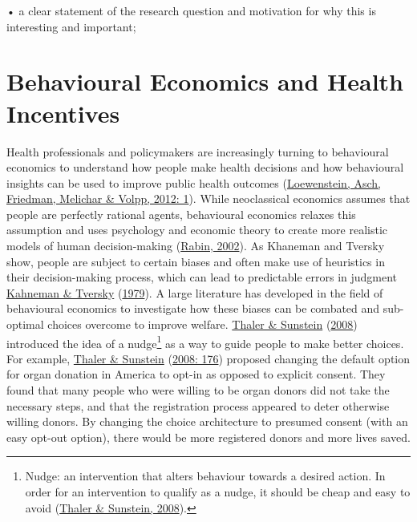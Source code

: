 \documentclass[11pt,preprint, authoryear]{elsarticle}
\numberwithin{equation}{section}
\numberwithin{figure}{section}
\numberwithin{table}{section}
\let\rmarkdownfootnote\footnote%
\def\footnote{\protect\rmarkdownfootnote}
\begin{document}
• a clear statement of the research question and motivation for why this
is interesting and important;

\hypertarget{behavioural-economics-and-health-incentives}{%
\section{\texorpdfstring{Behavioural Economics and Health Incentives
\label{lit}}{Behavioural Economics and Health Incentives }}\label{behavioural-economics-and-health-incentives}}

Health professionals and policymakers are increasingly turning to
behavioural economics to understand how people make health decisions and
how behavioural insights can be used to improve public health outcomes
(\protect\hyperlink{ref-health}{Loewenstein, Asch, Friedman, Melichar \&
Volpp, 2012: 1}). While neoclassical economics assumes that people are
perfectly rational agents, behavioural economics relaxes this assumption
and uses psychology and economic theory to create more realistic models
of human decision-making (\protect\hyperlink{ref-rabin}{Rabin, 2002}).
As Khaneman and Tversky show, people are subject to certain biases and
often make use of heuristics in their decision-making process, which can
lead to predictable errors in judgment
\protect\hyperlink{ref-prospect}{Kahneman \& Tversky}
(\protect\hyperlink{ref-prospect}{1979}). A large literature has
developed in the field of behavioural economics to investigate how these
biases can be combated and sub-optimal choices overcome to improve
welfare. \protect\hyperlink{ref-nudge}{Thaler \& Sunstein}
(\protect\hyperlink{ref-nudge}{2008}) introduced the idea of a
nudge\footnote{Nudge: an intervention that alters behaviour towards a
  desired action. In order for an intervention to qualify as a nudge, it
  should be cheap and easy to avoid
  (\protect\hyperlink{ref-nudge}{Thaler \& Sunstein, 2008}).} as a way
to guide people to make better choices. For example,
\protect\hyperlink{ref-nudge}{Thaler \& Sunstein}
(\protect\hyperlink{ref-nudge}{2008: 176}) proposed changing the default
option for organ donation in America to opt-in as opposed to explicit
consent. They found that many people who were willing to be organ donors
did not take the necessary steps, and that the registration process
appeared to deter otherwise willing donors. By changing the choice
architecture to presumed consent (with an easy opt-out option), there
would be more registered donors and more lives saved.
\end{document}
